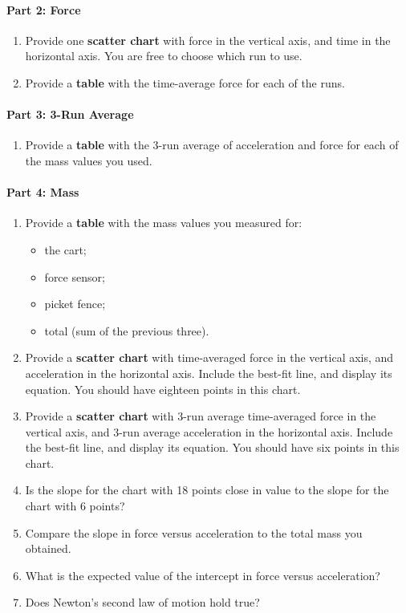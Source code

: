 \paragraph{Part 2: Force}
%
\begin{enumerate}
    \item Provide one \textbf{scatter chart} with force in the vertical axis, and time in the horizontal axis. You are free to choose which run to use.
    \item Provide a \textbf{table} with the time-average force for each of the runs.
\end{enumerate}
%
\paragraph{Part 3: 3-Run Average}
%
\begin{enumerate}
    \item Provide a \textbf{table} with the 3-run average of acceleration and force for each of the mass values you used.
\end{enumerate}
%
\paragraph{Part 4: Mass}
%
\begin{enumerate}
    \item Provide a \textbf{table} with the mass values you measured for:
    \begin{itemize}
        \item the cart;
        \item force sensor;
        \item picket fence;
        \item total (sum of the previous three).
    \end{itemize}
    \item Provide a \textbf{scatter chart} with time-averaged force in the vertical axis, and acceleration in the horizontal axis. Include the best-fit line, and display its equation. You should have eighteen points in this chart.
    \item Provide a \textbf{scatter chart} with 3-run average time-averaged force in the vertical axis, and 3-run average acceleration in the horizontal axis. Include the best-fit line, and display its equation. You should have six points in this chart.
    \item Is the slope for the chart with 18 points close in value to the slope for the chart with 6 points?
    \item Compare the slope in force versus acceleration to the total mass you obtained.
    \item What is the expected value of the intercept in force versus acceleration?
    \item Does Newton's second law of motion hold true?
\end{enumerate}
%
\newpage
